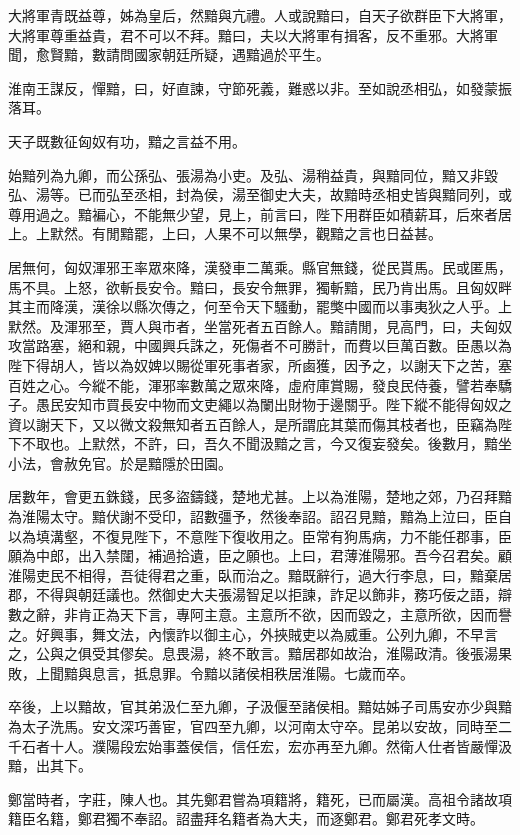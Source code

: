 大將軍青既益尊，姊為皇后，然黯與亢禮。人或說黯曰，自天子欲群臣下大將軍，大將軍尊重益貴，君不可以不拜。黯曰，夫以大將軍有揖客，反不重邪。大將軍聞，愈賢黯，數請問國家朝廷所疑，遇黯過於平生。

淮南王謀反，憚黯，曰，好直諫，守節死義，難惑以非。至如說丞相弘，如發蒙振落耳。

天子既數征匈奴有功，黯之言益不用。

始黯列為九卿，而公孫弘、張湯為小吏。及弘、湯稍益貴，與黯同位，黯又非毀弘、湯等。已而弘至丞相，封為侯，湯至御史大夫，故黯時丞相史皆與黯同列，或尊用過之。黯褊心，不能無少望，見上，前言曰，陛下用群臣如積薪耳，后來者居上。上默然。有閒黯罷，上曰，人果不可以無學，觀黯之言也日益甚。

居無何，匈奴渾邪王率眾來降，漢發車二萬乘。縣官無錢，從民貰馬。民或匿馬，馬不具。上怒，欲斬長安令。黯曰，長安令無罪，獨斬黯，民乃肯出馬。且匈奴畔其主而降漢，漢徐以縣次傳之，何至令天下騷動，罷獘中國而以事夷狄之人乎。上默然。及渾邪至，賈人與市者，坐當死者五百餘人。黯請閒，見高門，曰，夫匈奴攻當路塞，絕和親，中國興兵誅之，死傷者不可勝計，而費以巨萬百數。臣愚以為陛下得胡人，皆以為奴婢以賜從軍死事者家，所鹵獲，因予之，以謝天下之苦，塞百姓之心。今縱不能，渾邪率數萬之眾來降，虛府庫賞賜，發良民侍養，譬若奉驕子。愚民安知市買長安中物而文吏繩以為闌出財物于邊關乎。陛下縱不能得匈奴之資以謝天下，又以微文殺無知者五百餘人，是所謂庇其葉而傷其枝者也，臣竊為陛下不取也。上默然，不許，曰，吾久不聞汲黯之言，今又復妄發矣。後數月，黯坐小法，會赦免官。於是黯隱於田園。

居數年，會更五銖錢，民多盜鑄錢，楚地尤甚。上以為淮陽，楚地之郊，乃召拜黯為淮陽太守。黯伏謝不受印，詔數彊予，然後奉詔。詔召見黯，黯為上泣曰，臣自以為填溝壑，不復見陛下，不意陛下復收用之。臣常有狗馬病，力不能任郡事，臣願為中郎，出入禁闥，補過拾遺，臣之願也。上曰，君薄淮陽邪。吾今召君矣。顧淮陽吏民不相得，吾徒得君之重，臥而治之。黯既辭行，過大行李息，曰，黯棄居郡，不得與朝廷議也。然御史大夫張湯智足以拒諫，詐足以飾非，務巧佞之語，辯數之辭，非肯正為天下言，專阿主意。主意所不欲，因而毀之，主意所欲，因而譽之。好興事，舞文法，內懷詐以御主心，外挾賊吏以為威重。公列九卿，不早言之，公與之俱受其僇矣。息畏湯，終不敢言。黯居郡如故治，淮陽政清。後張湯果敗，上聞黯與息言，抵息罪。令黯以諸侯相秩居淮陽。七歲而卒。

卒後，上以黯故，官其弟汲仁至九卿，子汲偃至諸侯相。黯姑姊子司馬安亦少與黯為太子洗馬。安文深巧善宦，官四至九卿，以河南太守卒。昆弟以安故，同時至二千石者十人。濮陽段宏始事蓋侯信，信任宏，宏亦再至九卿。然衛人仕者皆嚴憚汲黯，出其下。

鄭當時者，字莊，陳人也。其先鄭君嘗為項籍將，籍死，已而屬漢。高祖令諸故項籍臣名籍，鄭君獨不奉詔。詔盡拜名籍者為大夫，而逐鄭君。鄭君死孝文時。

